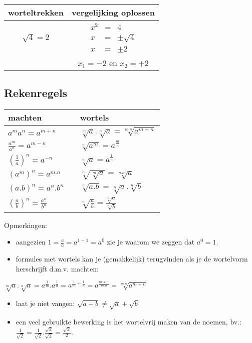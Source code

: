 \begin{table}
\centering
\begin{tabular}{|c||c|}
\hline 
worteltrekken & vergelijking oplossen\tabularnewline
\hline 
\hline 
${\displaystyle \sqrt{4}=2}$ & ${\displaystyle \begin{array}{lll}
x^{2} & = & 4\\
x & = & \pm\sqrt{4}\\
x & = & \pm2
\end{array}}$\tabularnewline
\hline 
 &  ${\displaystyle x_{1}=-2}$ en ${\displaystyle x_{2}=+2}$\tabularnewline
\hline 
\end{tabular}
\end{table}


\subsection{Rekenregels}

\begin{table}
	\centering
\begin{tabular}{|l|c|l|}
\hline 
machten &  & wortels\tabularnewline
\hline 
\hline 
${\displaystyle a^{m}a^{n}=a^{m+n}}$ &  & ${\displaystyle \sqrt[m]{a}.\sqrt[n]{a}=\sqrt[m.n]{a^{m+n}}}$\tabularnewline
\hline 
${\displaystyle \frac{a^{m}}{a^{n}}=a^{m-n}}$ &  & ${\displaystyle \sqrt[n]{a^{m}}=a^{\frac{m}{n}}}$\tabularnewline
\hline 
${\displaystyle \left(\frac{1}{a}\right)^{n}=a^{-n}}$ &  & ${\displaystyle \sqrt[n]{a}=a^{\frac{1}{n}}}$\tabularnewline
\hline 
${\displaystyle \left(a^{m}\right)^{n}=a^{m.n}}$ &  & ${\displaystyle \sqrt[n]{\sqrt[m]{a}}=\sqrt[n.m]{a}}$\tabularnewline
\hline 
${\displaystyle \left(a.b\right)^{n}=a^{n}.b^{n}}$ &  & ${\displaystyle \sqrt[n]{a.b}=\sqrt[n]{a}.\sqrt[n]{b}}$\tabularnewline
\hline 
${\displaystyle \left(\frac{a}{b}\right)^{n}=\frac{a^{n}}{b^{n}}}$ &  & ${\displaystyle \sqrt[n]{\frac{a}{b}}=\frac{\sqrt[n]{a}}{\sqrt[n]{b}}}$\tabularnewline
\hline 
\end{tabular}
\end{table}
\medskip{}


\noindent Opmerkingen:
\begin{itemize}
\item aangezien ${\displaystyle 1=\frac{a}{a}=a^{1-1}=a^{0}}$ zie je waarom
we zeggen dat ${\displaystyle a^{0}=1}$.
\item formules met wortels kan je (gemakkelijk) terugvinden als je de wortelvorm
herschrijft d.m.v. machten:
\end{itemize}
${\displaystyle \sqrt[m]{a}.\sqrt[n]{a}=a^{\frac{1}{m}}.a^{\frac{1}{n}}=a^{\frac{1}{m}+\frac{1}{n}}=a^{\frac{m+n}{m.n}}=\sqrt[m.n]{a^{m+n}}}$
\begin{itemize}
\item laat je niet vangen: ${\displaystyle \sqrt{a+b}\neq\sqrt{a}+\sqrt{b}}$
\item een veel gebruikte bewerking is het wortelvrij maken van de noemen,
bv.: ${\displaystyle \frac{1}{\sqrt{2}}=\frac{1}{\sqrt{2}}.\frac{\sqrt{2}}{\sqrt{2}}=\frac{\sqrt{2}}{2}.}$
\end{itemize}

